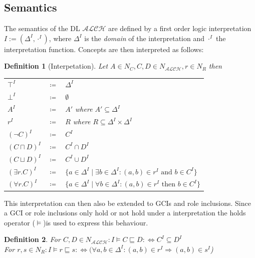 \documentclass[titlepage]{article}
\newtheorem{definition}{Definition}
\begin{document}
\subsection{Semantics}
The semantics of the DL $\mathcal{ALCH}$ are defined by a first order logic interpretation
$I := (\Delta^I, \cdot^I)$, where $\Delta^I$ is the \emph{domain} of the interpretation
and $\cdot^I$ the interpretation function.
Concepts are then interpreted as follows:
\begin{definition}[Interpetation]
  Let $A \in N_C, C, D \in N_{\mathcal{ALCH}}, r \in N_R$ then
  \begin{center}
    \begin{tabular}{l c l}
    
      $\top^I$& $\coloneqq$& $\Delta^I$ \\
      $\bot^I$& $\coloneqq$& $\emptyset$\\      
      $A^I$ & $\coloneqq$ & $A'$ where $A' \subseteq \Delta^I$ \\
      $r^I$ & $\coloneqq$ & $R$ where $R \subseteq \Delta^I \times \Delta^I$\\
      $(\neg C)^I$ & $\coloneqq$ & $C^I$ \\
      $(C \sqcap D)^I$ & $\coloneqq$ & $C^I \cap D^I$ \\
      $(C \sqcup D)^I$ & $\coloneqq$ & $C^I \cup D^I$ \\
      $(\exists r.C)^I$ & $\coloneqq$ & $ \{a \in \Delta^I \mid \exists b \in \Delta^I : (a,b) \in r^I \text{ and } b \in C^I \}$ \\
      $(\forall r.C)^I$ & $\coloneqq$ & $ \{a \in \Delta^I \mid \forall b \in \Delta^I : (a,b) \in r^I \text{ then } b \in C^I \}$ \\
      \end{tabular}        
  \end{center}
\end{definition}  
This interpretation can then also be extended to GCIs and role inclusions. Since a GCI or role inclusions only hold
or not hold under a interpretation the holds operator ($\models$)is used to express this 
behaviour.

\begin{definition}
    For $C, D \in N_{\mathcal{ALCH}}: I \models C \sqsubseteq D  :\iff C^I \subseteq D^I$ \\
    For $r, s \in N_R: I \models r \sqsubseteq s  :\iff (\forall a,b \in \Delta^I: (a,b) \in r^I \Rightarrow (a,b) \in s^I$)
\end{definition}
\end{document}
